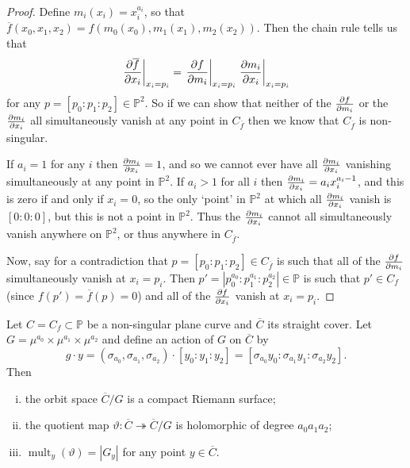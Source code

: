 \documentclass[10pt,notitlepage]{article}
\numberwithin{equation}{subsection}
\DeclareMathOperator{\mult}{mult}
\newcommand{\pee}{\mathbb{P}}
\newcommand{\cover}[1]{\overline{#1}}
\begin{document}
        \begin{proof}
            Define $m_i(x_i)=x_i^{a_i}$, so that $\cover{f}(x_0,x_1,x_2)=f(m_0(x_0),m_1(x_1),m_2(x_2))$.
            Then the chain rule tells us that
            \[
                \eval{\pdv{\cover{f}}{x_i}}_{x_i=p_i} = \eval{\pdv{f}{m_i}}_{x_i=p_i} \eval{\pdv{m_i}{x_i}}_{x_i=p_i}
            \]
            for any $p=[p_0:p_1:p_2]\in\pee^2$.
            So if we can show that neither of the $\pdv{f}{m_i}$ or the $\pdv{m_i}{x_i}$ all simultaneously vanish at any point in $C_{\cover{f}}$ then we know that $C_{\cover{f}}$ is non-singular.

            If $a_i=1$ for any $i$ then $\pdv{m_i}{x_i}=1$, and so we cannot ever have all $\pdv{m_i}{x_i}$ vanishing simultaneously at any point in $\pee^2$.
            If $a_i>1$ for all $i$ then $\pdv{m_i}{x_i}=a_ix_i^{a_i-1}$, and this is zero if and only if $x_i=0$, so the only `point' in $\pee^2$ at which all $\pdv{m_i}{x_i}$ vanish is $[0:0:0]$, but this is not a point in $\pee^2$.
            Thus the $\pdv{m_i}{x_i}$ cannot all simultaneously vanish anywhere on $\pee^2$, or thus anywhere in $C_{\cover{f}}$.

            Now, say for a contradiction that $p=[p_0:p_1:p_2]\in C_{\cover{f}}$ is such that all of the $\pdv{f}{m_i}$ simultaneously vanish at $x_i=p_i$.
            Then $p'=|p_0^{a_0}:p_1^{a_1}:p_2^{a_2}|\in\pee$ is such that $p'\in C_f$ (since $f(p')=\cover{f}(p)=0$) and all of the $\pdv{f}{x_i}$ vanish at $x_i=p_i$.
        \end{proof}

        \begin{lemma}\label{lem:quotient-of-cover}
            Let $C=C_f\subset\pee$ be a non-singular plane curve and $\cover{C}$ its straight cover.
            Let $G=\mu^{a_0}\times\mu^{a_1}\times\mu^{a_2}$ and define an action of $G$ on $\cover{C}$ by
            \[
                g\cdot y = (\sigma_{a_0},\sigma_{a_1},\sigma_{a_2})\cdot [y_0:y_1:y_2] = [\sigma_{a_0}y_0:\sigma_{a_1}y_1:\sigma_{a_2}y_2].
            \]
            Then
            \begin{enumerate}[(i)]
                \item the orbit space $\cover{C}/G$ is a compact Riemann surface;
                \item the quotient map $\vartheta\colon \cover{C}\twoheadrightarrow\cover{C}/G$ is holomorphic of degree $a_0a_1a_2$;
                \item $\mult_y(\vartheta)=|G_y|$ for any point $y\in\cover{C}$.\qedhere
            \end{enumerate}
        \end{lemma}
\end{document}

